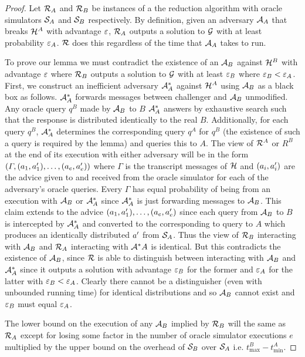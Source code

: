 \begin{proof}
  Let $\mathcal{R}_A$ and $\mathcal{R}_B$ be instances of a the reduction algorithm with oracle simulators $\mathcal{S}_A$ and $\mathcal{S}_B$ respectively.
  By definition, given an adversary $\mathcal{A}_A$ that breaks $\mathcal{H}^A$ with advantage $\varepsilon$, $\mathcal{R}_A$ outputs a solution to $\mathcal{G}$ with at least probability $\varepsilon_A$.
  $\mathcal{R}$ does this regardless of the time that $\mathcal{A}_A$ takes to run.

  To prove our lemma we must contradict the existence of an $\mathcal{A}_B$ against $\mathcal{H}^B$ with advantage $\varepsilon$ where $\mathcal{R}_B$ outputs a solution to $\mathcal{G}$ with at least $\varepsilon_B$ where $\varepsilon_B <  \varepsilon_A$.
  First, we construct an inefficient adversary $\mathcal{A}_A^*$ against $\mathcal{H}^A$ using $\mathcal{A}_B$ as a black box as follows.
  $\mathcal{A}_A^*$ forwards messages between challenger and $\mathcal{A}_B$ unmodified.
  Any oracle query $q^B$ made by $\mathcal{A}_B$ to $B$ $\mathcal{A}_A^*$ answers by exhaustive search such that the response is distributed identically to the real $B$.
  Additionally, for each query $q^B$, $\mathcal{A}_A^*$ determines the corresponding query $q^A$ for $q^B$ (the existence of such a query is required by the lemma) and queries this to $A$.
  The view of $\mathcal{R}^A$ or $R^B$ at the end of its execution with either adversary will be in the form $(\varGamma, (a_1,a'_1), \dots, (a_e,a'_e))$
  where $\varGamma$ is the transcript messages of $\mathcal{H}$ and $(a_i,a'_i)$ are the advice given to and received from the oracle simulator for each of the adversary's oracle queries.
  Every $\varGamma$ has equal probability of being from an execution with $\mathcal{A}_B$ or $\mathcal{A}_A^*$ since $\mathcal{A}_A^*$ is just forwarding messages to $\mathcal{A}_B$.
  This claim extends to the advice $(a_1,a'_1), \dots, (a_e,a'_e)$ since each query from $\mathcal{A}_B$ to $B$ is intercepted by $\mathcal{A}_A^*$ and converted to the corresponding to query to $A$ which produces an identically distributed $a'$ from $\mathcal{S}_A$. Thus the view of $\mathcal{R}_B$ interacting with $\mathcal{A}_B$ and $\mathcal{R}_A$ interacting with $\mathcal{A}^*A$ is identical.
  But this contradicts the existence of $\mathcal{A}_B$, since $\mathcal{R}$ is able to distinguish between interacting with $\mathcal{A}_B$ and $\mathcal{A}_A^*$ since it outputs a solution with advantage $\varepsilon_B$ for the former and $\varepsilon_A$ for the latter with $\varepsilon_B < \varepsilon_A$.
  Clearly there cannot be a distinguisher (even with unbounded running time) for identical distributions and so $\mathcal{A}_B$ cannot exist and $\varepsilon_B$ must equal $\varepsilon_A$.

  The lower bound on the execution of any $\mathcal{A}_B$ implied by $\mathcal{R}_B$ will the same as $\mathcal{R}_A$ except for losing some factor in the number of oracle simulator executions $e$ multiplied by the upper bound on the overhead of $\mathcal{S}_B$ over $\mathcal{S}_A$ i.e. $t^B_{\max} - t^A_{\min}$.
\end{proof}

